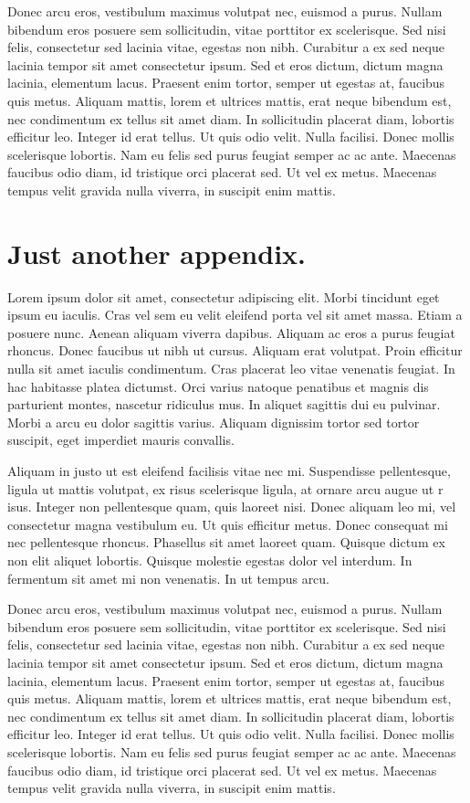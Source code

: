 \documentclass[openany]{book}
\begin{document}
Donec arcu eros, vestibulum maximus volutpat nec, euismod a purus. Nullam bibendum 
eros posuere sem sollicitudin, vitae porttitor ex scelerisque. Sed nisi felis, 
consectetur sed lacinia vitae, egestas non nibh. Curabitur a ex sed neque lacinia 
tempor sit amet consectetur ipsum. Sed et eros dictum, dictum magna lacinia, 
elementum lacus. Praesent enim tortor, semper ut egestas at, faucibus quis metus. 
Aliquam mattis, lorem et ultrices mattis, erat neque bibendum est, nec condimentum 
ex tellus sit amet diam. In sollicitudin placerat diam, lobortis efficitur leo. 
Integer id erat tellus. Ut quis odio velit. Nulla facilisi. Donec mollis 
scelerisque lobortis. Nam eu felis sed purus feugiat semper ac ac ante. Maecenas 
faucibus odio diam, id tristique orci placerat sed. Ut vel ex metus. Maecenas 
tempus velit gravida nulla viverra, in suscipit enim mattis.



\chapter{Just another appendix.}
Lorem ipsum dolor sit amet, consectetur adipiscing elit. Morbi tincidunt eget 
ipsum eu iaculis. Cras vel sem eu velit eleifend porta vel sit amet massa. Etiam 
a posuere nunc. Aenean aliquam viverra dapibus. Aliquam ac eros a purus feugiat 
rhoncus. Donec faucibus ut nibh ut cursus. Aliquam erat volutpat. Proin efficitur 
nulla sit amet iaculis condimentum. Cras placerat leo vitae venenatis feugiat. In 
hac habitasse platea dictumst. Orci varius natoque penatibus et magnis dis 
parturient montes, nascetur ridiculus mus. In aliquet sagittis dui eu pulvinar. 
Morbi a arcu eu dolor sagittis varius. Aliquam dignissim tortor sed tortor 
suscipit, eget imperdiet mauris convallis.

Aliquam in justo ut est eleifend facilisis vitae nec mi. Suspendisse pellentesque, 
ligula ut mattis volutpat, ex risus scelerisque ligula, at ornare arcu augue ut r
isus. Integer non pellentesque quam, quis laoreet nisi. Donec aliquam leo mi, vel 
consectetur magna vestibulum eu. Ut quis efficitur metus. Donec consequat mi nec 
pellentesque rhoncus. Phasellus sit amet laoreet quam. Quisque dictum ex non elit 
aliquet lobortis. Quisque molestie egestas dolor vel interdum. In fermentum sit 
amet mi non venenatis. In ut tempus arcu.

Donec arcu eros, vestibulum maximus volutpat nec, euismod a purus. Nullam bibendum 
eros posuere sem sollicitudin, vitae porttitor ex scelerisque. Sed nisi felis, 
consectetur sed lacinia vitae, egestas non nibh. Curabitur a ex sed neque lacinia 
tempor sit amet consectetur ipsum. Sed et eros dictum, dictum magna lacinia, 
elementum lacus. Praesent enim tortor, semper ut egestas at, faucibus quis metus. 
Aliquam mattis, lorem et ultrices mattis, erat neque bibendum est, nec condimentum 
ex tellus sit amet diam. In sollicitudin placerat diam, lobortis efficitur leo. 
Integer id erat tellus. Ut quis odio velit. Nulla facilisi. Donec mollis 
scelerisque lobortis. Nam eu felis sed purus feugiat semper ac ac ante. Maecenas 
faucibus odio diam, id tristique orci placerat sed. Ut vel ex metus. Maecenas 
tempus velit gravida nulla viverra, in suscipit enim mattis.
\end{document}
